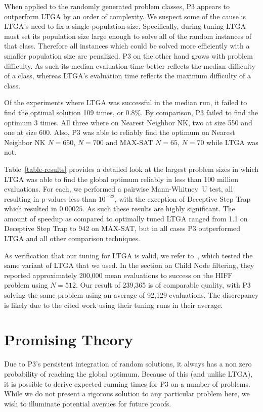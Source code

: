 \documentclass{sig-alternate}
\begin{document}
When applied to the randomly generated problem classes, P3 appears to outperform LTGA
by an order of complexity.  We suspect some of the cause is LTGA's need to fix
a single population size.  Specifically, during tuning LTGA must set its population
size large enough to solve all of the random instances of that class.  Therefore
all instances which could be solved more efficiently with a smaller population size
are penalized.  P3 on the other hand grows with problem difficulty.  As such its
median evaluation time better reflects the median difficulty of a class, whereas LTGA's
evaluation time reflects the maximum difficulty of a class.

Of the experiments where LTGA was successful in the median run, it failed to find the optimal solution
109 times, or 0.8\%.  By comparison, P3 failed to find the optimum 3 times.  All three
where on Nearest Neighbor NK, two at size 550 and one at size 600.  Also, P3 was able
to reliably find the optimum on Nearest Neighbor NK $N=650$, $N=700$ and MAX-SAT $N=65$, $N=70$
while LTGA was not.

Table~\ref{table-results} provides a detailed look at the largest problem sizes
in which LTGA was able to find the global optimum reliably in less than 100 million
evaluations.  For each, we performed a pairwise Mann-Whitney~U test, all resulting
in p-values less than $10^{-22}$, with the exception of Deceptive Step Trap which
resulted in $0.00025$.  As such these results are highly significant.  The amount
of speedup as compared to optimally tuned LTGA ranged from 1.1 on Deceptive Step Trap to 942 on MAX-SAT, but in all
cases P3 outperformed LTGA and all other comparison techniques.

As verification that our tuning for LTGA is valid, we refer
to~\cite{thierens:2013:ltgahiff}, which tested the same variant of LTGA that we
used.  In the section on Child Node filtering, they reported approximately 200,000
mean evaluations to success on the HIFF problem using $N=512$.  Our result of
239,365 is of comparable quality, with P3 solving the same problem using an average
of 92,129 evaluations.  The discrepancy is likely due to the cited work using
their tuning runs in their average.

\section{Promising Theory}
Due to P3's persistent integration of random solutions, it always has
a non zero probability of reaching the global optimum.  Because of
this (and unlike LTGA), it is possible to derive expected
running times for P3 on a number of problems.  While we do not present
a rigorous solution to any particular problem here, we wish to
illuminate potential avenues for future proofs.
\end{document}
